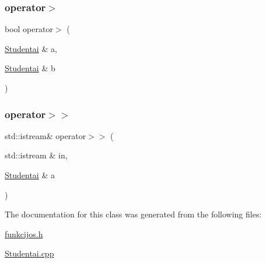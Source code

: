 \mbox{\label{class_studentai_a6d7c4a8ee5a8fa7c191e5ecfb41645b5}} 
\subsubsection{\texorpdfstring{operator$>$}{operator>}}
{\footnotesize\ttfamily bool operator$>$ (\begin{DoxyParamCaption}\item[{\mbox{\hyperlink{class_studentai}{Studentai}} \&}]{a,  }\item[{\mbox{\hyperlink{class_studentai}{Studentai}} \&}]{b }\end{DoxyParamCaption})\hspace{0.3cm}{\ttfamily [friend]}}

\mbox{\label{class_studentai_a26a2195becea6f359ea305a80239387e}} 
\subsubsection{\texorpdfstring{operator$>$$>$}{operator>>}}
{\footnotesize\ttfamily std\+::istream\& operator$>$$>$ (\begin{DoxyParamCaption}\item[{std\+::istream \&}]{in,  }\item[{\mbox{\hyperlink{class_studentai}{Studentai}} \&}]{a }\end{DoxyParamCaption})\hspace{0.3cm}{\ttfamily [friend]}}



The documentation for this class was generated from the following files\+:\begin{DoxyCompactItemize}
\item 
\mbox{\hyperlink{funkcijos_8h}{funkcijos.\+h}}\item 
\mbox{\hyperlink{_studentai_8cpp}{Studentai.\+cpp}}\end{DoxyCompactItemize}
